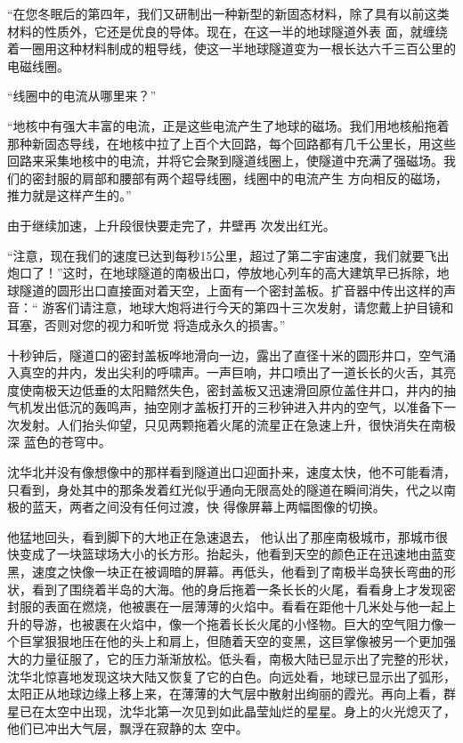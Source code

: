 \documentclass{article}
\begin{document}
“在您冬眠后的第四年，我们又研制出一种新型的新固态材料，除了具有以前这类材料的性质外，它还是优良的导体。现在，在这一半的地球隧道外表
\newpage
面，就缠绕着一圈用这种材料制成的粗导线，使这一半地球隧道变为一根长达六千三百公里的电磁线圈。


“线圈中的电流从哪里来？” 

“地核中有强大丰富的电流，正是这些电流产生了地球的磁场。我们用地核船拖着那种新固态导线，在地核中拉了上百个大回路，每个回路都有几千公里长，用这些回路来采集地核中的电流，并将它会聚到隧道线圈上，使隧道中充满了强磁场。我们的密封服的肩部和腰部有两个超导线圈，线圈中的电流产生
方向相反的磁场，推力就是这样产生的。” 

由于继续加速，上升段很快要走完了，井壁再
次发出红光。 

“注意，现在我们的速度已达到每秒15公里，超过了第二宇宙速度，我们就要飞出炮口了！”这时，在地球隧道的南极出口，停放地心列车的高大建筑早已拆除，地球隧道的圆形出口直接面对着天空，上面有一个密封盖板。扩音器中传出这样的声音：“
\newpage
游客们请注意，地球大炮将进行今天的第四十三次发射，请您戴上护目镜和耳塞，否则对您的视力和听觉
将造成永久的损害。” 

十秒钟后，隧道口的密封盖板哗地滑向一边，露出了直径十米的圆形井口，空气涌入真空的井内，发出尖利的呼啸声。一声巨响，井口喷出了一道长长的火舌，其亮度使南极天边低垂的太阳黯然失色，密封盖板又迅速滑回原位盖住井口，井内的抽气机发出低沉的轰鸣声，抽空刚才盖板打开的三秒钟进入井内的空气，以准备下一次发射。人们抬头仰望，只见两颗拖着火尾的流星正在急速上升，很快消失在南极深
蓝色的苍穹中。 

沈华北并没有像想像中的那样看到隧道出口迎面扑来，速度太快，他不可能看清，只看到，身处其中的那条发着红光似乎通向无限高处的隧道在瞬间消失，代之以南极的蓝天，两者之间没有任何过渡，快
得像屏幕上两幅图像的切换。 

他猛地回头，看到脚下的大地正在急速退去，
\newpage
他认出了那座南极城市，那城市很快变成了一块篮球场大小的长方形。抬起头，他看到天空的颜色正在迅速地由蓝变黑，速度之快像一块正在被调暗的屏幕。再低头，他看到了南极半岛狭长弯曲的形状，看到了围绕着半岛的大海。他的身后拖着一条长长的火尾，看看身上才发现密封服的表面在燃烧，他被裹在一层薄薄的火焰中。看看在距他十几米处与他一起上升的导游，也被裹在火焰中，像一个拖着长长火尾的小怪物。巨大的空气阻力像一个巨掌狠狠地压在他的头上和肩上，但随着天空的变黑，这巨掌像被另一个更加强大的力量征服了，它的压力渐渐放松。低头看，南极大陆已显示出了完整的形状，沈华北惊喜地发现这块大陆又恢复了它的白色。向远处看，地球已显示出了弧形，太阳正从地球边缘上移上来，在薄薄的大气层中散射出绚丽的霞光。再向上看，群星已在太空中出现，沈华北第一次见到如此晶莹灿烂的星星。身上的火光熄灭了，他们已冲出大气层，飘浮在寂静的太
空中。 
\end{document}
